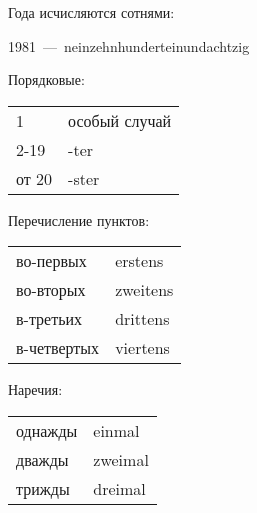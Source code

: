 Года исчисляются сотнями:

1981~---~neinzehnhunderteinundachtzig

Порядковые:
\begin{tabular}{ll}
1 & особый случай \\
2-19 & -ter \\
от 20 & -ster
\end{tabular}

Перечисление пунктов:
\begin{tabular}{ll}
во-первых & erstens \\
во-вторых & zweitens \\
в-третьих & drittens \\
в-четвертых & viertens
\end{tabular}

Наречия:
\begin{tabular}{ll}
однажды & einmal \\
дважды & zweimal \\
трижды & dreimal
\end{tabular}
